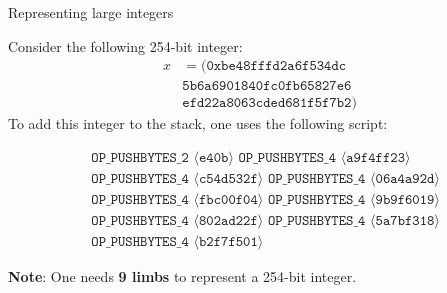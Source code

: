 \documentclass{zkdl-presentation-template}
\newcommand{\elem}[1]{\, \langle #1 \rangle \,}
\newcommand{\opcode}[1]{\, \texttt{#1} \,}
\begin{document}
    \begin{frame}{Representing large integers}
        \begin{example}
            Consider the following 254-bit integer:
            \begin{align*}
                x &= (\mathtt{0xbe48fffd2a6f534dc} \\ &\mathtt{5b6a6901840fc0fb65827e6} \\
                &\mathtt{efd22a8063cded681f5f7b2})
            \end{align*}
            \pause To add this integer to the stack, one uses the following script:
            \begin{empheqboxed}
            \scriptsize
            \begin{align*}
               &\opcode{OP\_PUSHBYTES\_2} \elem{\mathtt{e40b}} \opcode{OP\_PUSHBYTES\_4} \elem{\mathtt{a9f4ff23}}
               \\ 
               &\opcode{OP\_PUSHBYTES\_4} \elem{\mathtt{c54d532f}} \opcode{OP\_PUSHBYTES\_4} \elem{\mathtt{06a4a92d}}
               \\
               &\opcode{OP\_PUSHBYTES\_4} \elem{\mathtt{fbc00f04}} \opcode{OP\_PUSHBYTES\_4} \elem{\mathtt{9b9f6019}}
               \\
               &\opcode{OP\_PUSHBYTES\_4} \elem{\mathtt{802ad22f}} 
               \opcode{OP\_PUSHBYTES\_4} \elem{\mathtt{5a7bf318}}
               \\
               &\opcode{OP\_PUSHBYTES\_4} \elem{\mathtt{b2f7f501}}
            \end{align*}
          \end{empheqboxed}
          \pause \textbf{Note}: One needs \textbf{9 limbs} to represent a 254-bit integer.
        \end{example}
    \end{frame}
\end{document}
